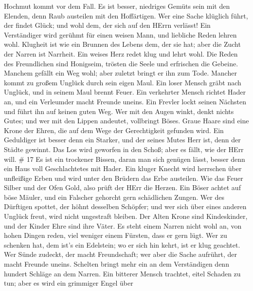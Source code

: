 Hochmut kommt vor dem Fall.  Es ist besser, niedriges
Gemüts sein mit den Elenden, denn Raub austeilen mit den Hoffärtigen.
 Wer eine Sache klüglich führt, der findet Glück; und wohl
dem, der sich auf den HErrn verlässt!  Ein Verständiger
wird gerühmt für einen weisen Mann, und liebliche Reden lehren wohl.
 Klugheit ist wie ein Brunnen des Lebens dem, der sie hat;
aber die Zucht der Narren ist Narrheit.  Ein weises Herz
redet klug und lehrt wohl.  Die Reden des Freundlichen sind
Honigseim, trösten die Seele und erfrischen die Gebeine. 
Manchem gefällt ein Weg wohl; aber zuletzt bringt er ihn zum Tode.
 Mancher kommt zu großem Unglück durch sein eigen Maul.
 Ein loser Mensch gräbt nach Unglück, und in seinem Maul
brennt Feuer.  Ein verkehrter Mensch richtet Hader an, und
ein Verleumder macht Freunde uneins.  Ein Frevler lockt
seinen Nächsten und führt ihn auf keinen guten Weg.  Wer
mit den Augen winkt, denkt nichts Gutes; und wer mit den Lippen
andeutet, vollbringt Böses.  Graue Haare sind eine Krone
der Ehren, die auf dem Wege der Gerechtigkeit gefunden wird.
 Ein Geduldiger ist besser denn ein Starker, und der seines
Mutes Herr ist, denn der Städte gewinnt.  Das Los wird
geworfen in den Schoß; aber es fällt, wie der HErr will. \# 17
 Es ist ein trockener Bissen, daran man sich genügen lässt,
besser denn ein Haus voll Geschlachtetes mit Hader.  Ein
kluger Knecht wird herrschen über unfleißige Erben und wird unter den
Brüdern das Erbe austeilen.  Wie das Feuer Silber und der
Ofen Gold, also prüft der HErr die Herzen.  Ein Böser achtet
auf böse Mäuler, und ein Falscher gehorcht gern schädlichen Zungen.
 Wer des Dürftigen spottet, der höhnt desselben Schöpfer;
und wer sich über eines anderen Unglück freut, wird nicht ungestraft
bleiben.  Der Alten Krone sind Kindeskinder, und der Kinder
Ehre sind ihre Väter.  Es steht einem Narren nicht wohl an,
von hohen Dingen reden, viel weniger einem Fürsten, dass er gern lügt.
 Wer zu schenken hat, dem ist's ein Edelstein; wo er sich
hin kehrt, ist er klug geachtet.  Wer Sünde zudeckt, der
macht Freundschaft; wer aber die Sache aufrührt, der macht Freunde
uneins.  Schelten bringt mehr ein an dem Verständigen denn
hundert Schläge an dem Narren.  Ein bitterer Mensch
trachtet, eitel Schaden zu tun; aber es wird ein grimmiger Engel über
